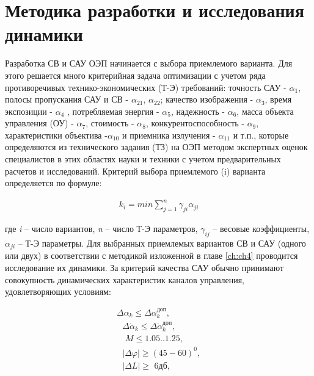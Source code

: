 \section{Методика разработки и исследования динамики} \label{sec:ch2/sec1-}


Разработка СВ и САУ ОЭП начинается с выбора приемлемого варианта. Для этого решается много критерийная задача оптимизации с учетом ряда противоречивых технико-экономических (Т-Э) требований: точность САУ -  $\alpha_{1}$, полосы пропускания САУ и СВ - $\alpha_{21}$, $\alpha_{22}$; качество изображения -  $\alpha_{3}$, время экспозиции -  $\alpha_{4}$ , потребляемая энергия -  $\alpha_{5}$, надежность -  $\alpha_{6}$, масса объекта управления (ОУ) -  $\alpha_{7}$, стоимость -  $\alpha_{8}$, конкурентоспособность - $\alpha_{9}$, характеристики объектива -$\alpha_{10}$ и приемника излучения - $\alpha_{11}$ и т.п., которые определяются из технического задания (ТЗ) на ОЭП методом экспертных оценок специалистов в этих областях науки и техники с учетом предварительных расчетов и исследований. Критерий выбора приемлемого (i) варианта определяется по формуле:

\begin{equation}
\label{eq:p2:1}
\begin{alignedat}{2}
k_i=min\sum_{j=1}^n{\gamma _{ji}\alpha _{ji}}
\end{alignedat}
\end{equation}

где \textit{i} – число вариантов, \textit{n} – число Т-Э параметров, $\gamma_{ij}$ – весовые коэффициенты, $\alpha_{ji}$ – Т-Э параметры. Для выбранных приемлемых вариантов  СВ и САУ (одного или двух) в соответствии с методикой изложенной в главе \ref{ch:ch4} проводится исследование их динамики. За критерий качества САУ обычно принимают совокупность динамических характеристик каналов управления, удовлетворяющих условиям:

\begin{equation}
\label{eq:p2:2}
\begin{alignedat}{2}
\varDelta \alpha _k\leqslant \varDelta \alpha _{k}^{доп},
\\
\,\,\,\,\varDelta \dot{\alpha}_k\leqslant \varDelta \dot{\alpha}_{k}^{доп},
\\
\,\,\,\,\,\,M\leqslant \text{1.05..1.25,}
\\
\,\,\,\,\left| \left. \varDelta \varphi \right| \right. \geqslant \left( 45-60 \right) ^0,
\\
\,\,\,\,\left| \left. \varDelta L \right|\geqslant \,\,6дб, \right. 
\end{alignedat}
\end{equation}

